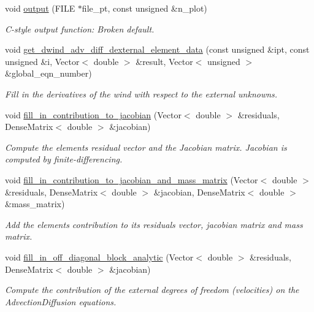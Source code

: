\begin{DoxyCompactItemize}
void \hyperlink{classoomph_1_1AdvectionDiffusionBoussinesqElement_adbe60877f205b36d76a87695afb28caa}{output} (F\+I\+LE $\ast$file\+\_\+pt, const unsigned \&n\+\_\+plot)
\begin{DoxyCompactList}\small\item\em C-\/style output function\+: Broken default. \end{DoxyCompactList}\item 
void \hyperlink{classoomph_1_1AdvectionDiffusionBoussinesqElement_a89ea74af5d011a3866999c3760621edf}{get\+\_\+dwind\+\_\+adv\+\_\+diff\+\_\+dexternal\+\_\+element\+\_\+data} (const unsigned \&ipt, const unsigned \&i, Vector$<$ double $>$ \&result, Vector$<$ unsigned $>$ \&global\+\_\+eqn\+\_\+number)
\begin{DoxyCompactList}\small\item\em Fill in the derivatives of the wind with respect to the external unknowns. \end{DoxyCompactList}\item 
void \hyperlink{classoomph_1_1AdvectionDiffusionBoussinesqElement_afc63db5ad4e397df7809447ee3ca56ac}{fill\+\_\+in\+\_\+contribution\+\_\+to\+\_\+jacobian} (Vector$<$ double $>$ \&residuals, Dense\+Matrix$<$ double $>$ \&jacobian)
\begin{DoxyCompactList}\small\item\em Compute the element\textquotesingle{}s residual vector and the Jacobian matrix. Jacobian is computed by finite-\/differencing. \end{DoxyCompactList}\item 
void \hyperlink{classoomph_1_1AdvectionDiffusionBoussinesqElement_a375fb98e225dbd5ac716ed3f68831069}{fill\+\_\+in\+\_\+contribution\+\_\+to\+\_\+jacobian\+\_\+and\+\_\+mass\+\_\+matrix} (Vector$<$ double $>$ \&residuals, Dense\+Matrix$<$ double $>$ \&jacobian, Dense\+Matrix$<$ double $>$ \&mass\+\_\+matrix)
\begin{DoxyCompactList}\small\item\em Add the element\textquotesingle{}s contribution to its residuals vector, jacobian matrix and mass matrix. \end{DoxyCompactList}\item 
void \hyperlink{classoomph_1_1AdvectionDiffusionBoussinesqElement_a9e859b487d8398ae696de72104c76271}{fill\+\_\+in\+\_\+off\+\_\+diagonal\+\_\+block\+\_\+analytic} (Vector$<$ double $>$ \&residuals, Dense\+Matrix$<$ double $>$ \&jacobian)
\begin{DoxyCompactList}\small\item\em Compute the contribution of the external degrees of freedom (velocities) on the Advection\+Diffusion equations. \end{DoxyCompactList}\end{DoxyCompactItemize}


